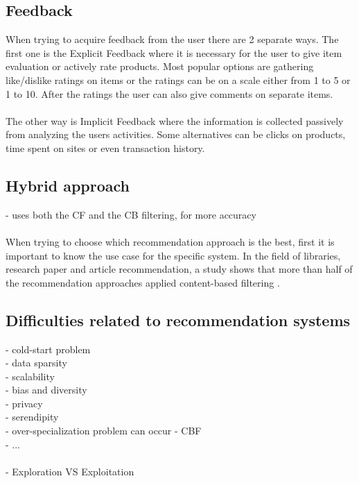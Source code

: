 \documentclass[10pt,oneside,english,a4paper]{article}
\begin{document}
\subsection{Feedback}
When trying to acquire feedback from the user there are 2 separate ways. The first one is the Explicit Feedback where it is necessary for the user to give item evaluation or actively rate products. Most popular options are gathering like/dislike ratings on items or the ratings can be on a scale either from 1 to 5 or 1 to 10. After the ratings the user can also give comments on separate items. \\\\
The other way is Implicit Feedback where the information is collected passively from analyzing the users activities. Some alternatives can be clicks on products, time spent on sites or even transaction history.\\



\subsection{Hybrid approach}
- uses both the CF and the CB filtering, for more accuracy\\\\
When trying to choose which recommendation approach is the best, first it is important to know the use case for the specific system. In the field of libraries, research paper and article recommendation, a study shows that more than half of the recommendation approaches applied content-based filtering \cite{Beel2016305}.




\clearpage
\subsection{Difficulties related to recommendation systems}
- cold-start problem\\
- data sparsity\\
- scalability\\
- bias and diversity\\
- privacy\\
- serendipity\\
- over-specialization problem can occur - CBF\\
- ...\\\\
- Exploration VS Exploitation\\\\
\end{document}

